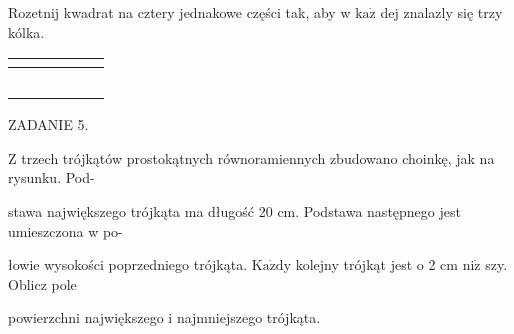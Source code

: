 \documentclass[a4paper,12pt]{article}
\begin{document}
Rozetnij kwadrat na cztery jednakowe części tak, aby w $\mathrm{k}\mathrm{a}\dot{\mathrm{z}}$ dej znalazly się trzy kólka.
\begin{center}
\begin{tabular}{|l|l|l|l|l|l|}
\hline
\multicolumn{1}{|l|}{}&	\multicolumn{1}{|l|}{}&	\multicolumn{1}{|l|}{}&	\multicolumn{1}{|l|}{}&	\multicolumn{1}{|l|}{}&	\multicolumn{1}{|l|}{}	\\
\hline
\multicolumn{1}{|l|}{}&	\multicolumn{1}{|l|}{}&	\multicolumn{1}{|l|}{}&	\multicolumn{1}{|l|}{}&	\multicolumn{1}{|l|}{}&	\multicolumn{1}{|l|}{}	\\
\hline
\multicolumn{1}{|l|}{}&	\multicolumn{1}{|l|}{}&	\multicolumn{1}{|l|}{}&	\multicolumn{1}{|l|}{}&	\multicolumn{1}{|l|}{}&	\multicolumn{1}{|l|}{}	\\
\hline
\multicolumn{1}{|l|}{}&	\multicolumn{1}{|l|}{}&	\multicolumn{1}{|l|}{}&	\multicolumn{1}{|l|}{}&	\multicolumn{1}{|l|}{}&	\multicolumn{1}{|l|}{}	\\
\hline
\multicolumn{1}{|l|}{}&	\multicolumn{1}{|l|}{}&	\multicolumn{1}{|l|}{}&	\multicolumn{1}{|l|}{}&	\multicolumn{1}{|l|}{}&	\multicolumn{1}{|l|}{}	\\
\hline
\multicolumn{1}{|l|}{}&	\multicolumn{1}{|l|}{}&	\multicolumn{1}{|l|}{}&	\multicolumn{1}{|l|}{}&	\multicolumn{1}{|l|}{}&	\multicolumn{1}{|l|}{}	\\
\hline
\end{tabular}
\end{center}
ZADANIE 5.

$\mathrm{Z}$ trzech trójkątów prostokątnych równoramiennych zbudowano choinkę, jak na rysunku. Pod-

stawa największego trójkąta ma długość 20 cm. Podstawa następnego jest umieszczona w po-

łowie wysokości poprzedniego trójkąta. $\mathrm{K}\mathrm{a}\dot{\mathrm{z}}\mathrm{d}\mathrm{y}$ kolejny trójkąt jest o 2 cm $\mathrm{n}\mathrm{i}\dot{\mathrm{z}}$ szy. Oblicz pole

powierzchni największego i najmniejszego trójkąta.
\end{document}
